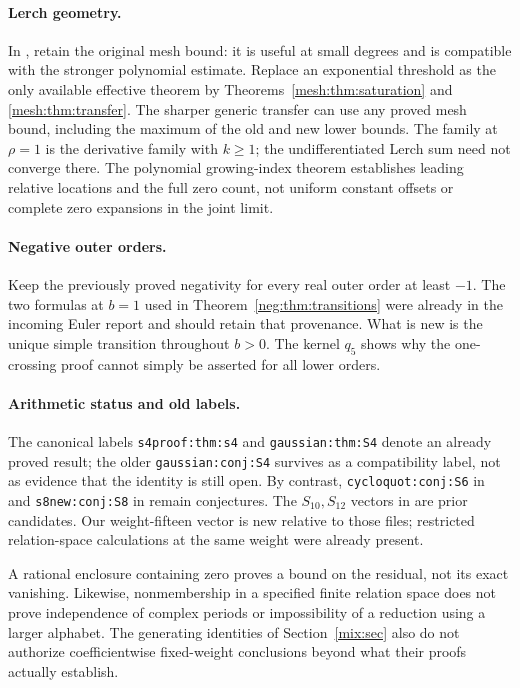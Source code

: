 \paragraph{Lerch geometry.}
In \cite[Section 4]{IncomingUniform}, retain the original mesh bound:
it is useful at small degrees and is compatible with the stronger
polynomial estimate. Replace an exponential threshold as the only
available effective theorem by
Theorems~\ref{mesh:thm:saturation} and \ref{mesh:thm:transfer}.
The sharper generic transfer can use any proved mesh bound, including
the maximum of the old and new lower bounds.
The family at $\rho=1$ is the derivative family with $k\ge1$;
the undifferentiated Lerch sum need not converge there.
The polynomial growing-index theorem establishes leading relative
locations and the full zero count, not uniform constant offsets or
complete zero expansions in the joint limit.

\paragraph{Negative outer orders.}
Keep the previously proved negativity for every real outer order
at least $-1$. The two formulas at $b=1$ used in
Theorem~\ref{neg:thm:transitions} were already in the incoming Euler
report and should retain that provenance. What is new is the unique
simple transition throughout $b>0$. The kernel $q_5$ shows why the
one-crossing proof cannot simply be asserted for all lower orders.

\paragraph{Arithmetic status and old labels.}
The canonical  labels
\texttt{s4proof:thm:s4} and \texttt{gaussian:thm:S4} denote an
already proved result; the older \texttt{gaussian:conj:S4} survives
as a compatibility label, not as evidence that the identity is still
open. By contrast, \texttt{cycloquot:conj:S6} in
 and
\texttt{s8new:conj:S8} in 
remain conjectures. The $S_{10},S_{12}$ vectors in
\cite[Section 5]{IncomingUniform} are prior candidates.
Our weight-fifteen vector is new relative to those files; restricted
relation-space calculations at the same weight were already present.

A rational enclosure containing zero proves a bound on the residual,
not its exact vanishing. Likewise, nonmembership in a specified
finite relation space does not prove independence of complex periods
or impossibility of a reduction using a larger alphabet.
The generating identities of Section~\ref{mix:sec} also do not
authorize coefficientwise fixed-weight conclusions beyond what their
proofs actually establish.

